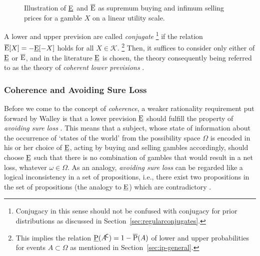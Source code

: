 \begin{figure}
\centering
{}
\caption{\label{fig:pricesforgambles}%
Illustration of \underline{E}\ and $\overline{\operatorname{E}}$ as supremum buying and infimum selling prices for a gamble $X$ on a linear utility scale.}
\end{figure}

A lower and upper prevision are called \emph{conjugate}%
\footnote{Conjugacy in this sense should not be confused
with conjugacy for prior distributions as discussed in Section~\ref{sec:regularconjugates}.}
if the relation $\overline{\operatorname{E}}[X] = -\underline{\operatorname{E}}[-X]$ holds for all $X \in \mathcal{K}$.%
\footnote{This implies the relation $\underline{\operatorname{P}}(A^{{\mbox{\!\scriptsize\textsf{C}}}}) = 1 - \overline{\operatorname{P}}(A)$
of lower and upper probabilities for events $A \subset \Omega$
as mentioned in Section~\ref{sec:ip-general}.}
Then, it suffices to consider only either of $\underline{\operatorname{E}}$ or $\overline{\operatorname{E}}$,
and in the literature $\underline{\operatorname{E}}$ is chosen,
the theory consequently being referred to as the theory of
\emph{coherent lower previsions} \parencite[see, e.g.,][\S 3.2]{itip}.

\subsubsection{Coherence and Avoiding Sure Loss}

Before we come to the concept of \emph{coherence},
a weaker rationality requirement put forward by Walley is
that a lower prevision $\underline{\operatorname{E}}$ should fulfill the property of
\emph{avoiding sure loss} \parencite[\S 2.4]{1991:walley}.
This means that a subject, whose state of information about the
occurrence of `states of the world' from the possibility space $\Omega$
is encoded in his or her choice of $\underline{\operatorname{E}}$,
acting by buying and selling gambles accordingly,
should choose $\underline{\operatorname{E}}$ such that there is no combination of gambles
that would result in a net loss, whatever $\omega \in \Omega$.
As an analogy, \emph{avoiding sure loss} can be regarded
like a logical inconsistency in a set of propositions,
i.e., there exist two propositions in the set of propositions
(the analogy to $\underline{\operatorname{E}}$) which are contradictory
\parencite[\S 2.4, footnote~1]{1991:walley}.

